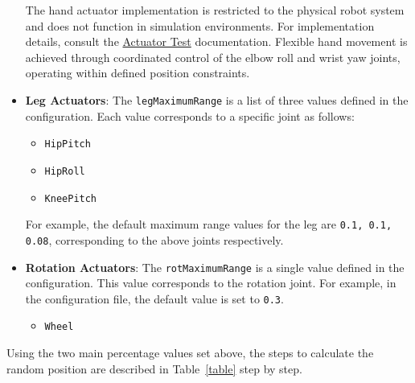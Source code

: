\documentclass{CSSRforAfrica}
\begin{document}
\begin{itemize}
    \begin{tcolorbox}[colback=yellow!20,colframe=yellow!50!black,title=NOTE]
The hand actuator implementation is restricted to the physical robot system and does not function in simulation environments. For implementation details, consult the \href{https://cssr4africa.github.io/deliverables/CSSR4Africa_Deliverable_D5.1.pdf}{Actuator Test} documentation. Flexible hand movement is achieved through coordinated control of the elbow roll and wrist yaw joints, operating within defined position constraints.
\end{tcolorbox}
    \item \textbf{Leg Actuators}: The \texttt{legMaximumRange} is a list of three values defined in the configuration. Each value corresponds to a specific joint as follows:
    \begin{itemize}
        \item \texttt{HipPitch}
        \item \texttt{HipRoll}
        \item \texttt{KneePitch}
    \end{itemize}
    For example, the default maximum range values for the leg are \texttt{0.1, 0.1, 0.08}, corresponding to the above joints respectively.

   \item \textbf{Rotation Actuators}: The \texttt{rotMaximumRange} is a single value defined in the configuration. This value corresponds to the rotation joint. For example, in the configuration file, the default value is set to \texttt{0.3}.
    \begin{itemize}
        \item \texttt{Wheel}
    \end{itemize}
\end{itemize}
Using the two main percentage values set above, the steps to calculate the random position are described in Table~\ref{table} step by step.
\end{document}
